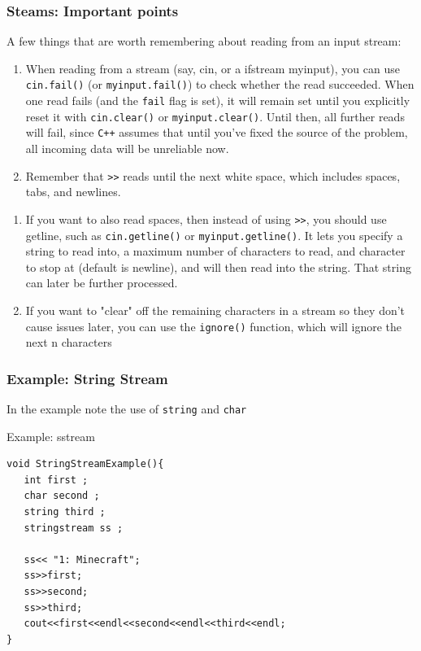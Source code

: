 \documentclass{beamer}
\begin{document}
\begin{frame}[fragile]
\frametitle{Steams: Important points}
A few things that are worth remembering about reading from an input stream:

\begin{enumerate}
\item When reading from a stream (say, cin, or a ifstream myinput), you can use \verb|cin.fail()| (or \verb|myinput.fail()|)
to check whether the read succeeded. When one read fails (and the \verb|fail| flag is set), it will remain set
until you explicitly reset it with \verb|cin.clear()| or \verb|myinput.clear()|. Until then, all further reads will
fail, since \verb|C++| assumes that until you’ve fixed the source of the problem, all incoming data will be
unreliable now.

\medskip

\item Remember that \verb|>>| reads until the next white space, which includes spaces, tabs, and newlines.

\end{enumerate}

\end{frame}
\begin{frame}[fragile]
\begin{enumerate}
\item If you want to also read spaces, then instead of using \verb|>>|, you should use getline, such as \verb|cin.getline()|
or \verb|myinput.getline()|. It lets you specify a string to read into, a maximum number of characters to
read, and character to stop at (default is newline), and will then read into the string. That string can
later be further processed.

\medskip

\item If you want to "clear" off the remaining characters in a stream so they don’t cause issues later, you can
use the \verb|ignore()| function, which will ignore the next n characters
\end{enumerate}

\end{frame}

\begin{frame}[fragile]
\frametitle{Example: String Stream}
In the example note the use of \texttt{string} and \texttt{char}
\begin{block}{Example: sstream}

\begin{verbatim}
void StringStreamExample(){
   int first ;
   char second ;
   string third ;
   stringstream ss ;
   
   ss<< "1: Minecraft";
   ss>>first;
   ss>>second;
   ss>>third;
   cout<<first<<endl<<second<<endl<<third<<endl;
}
\end{verbatim}

\end{block}

\end{frame}
\end{document}
